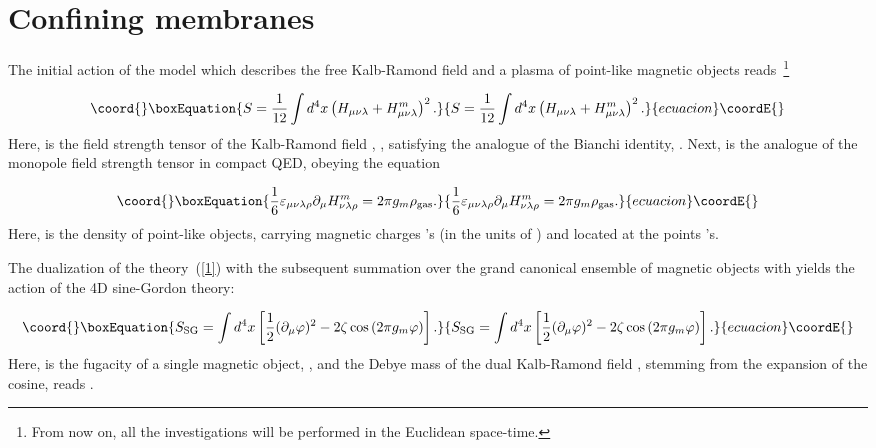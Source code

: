 \documentclass[a4paper,12pt]{article}
\begin{document}
\section{Confining membranes}

The initial action of 
the model which describes the free Kalb-Ramond field and a plasma of point-like magnetic objects 
reads~\footnote{From now on, all the investigations will be performed in the 
Euclidean space-time.}

\begin{equation}\coord{}\boxEquation{
\label{1}
S=\frac{1}{12}\int d^4x\left(H_{\mu\nu\lambda}+H_{\mu\nu\lambda}^m\right)^2.
}{
S=\frac{1}{12}\int d^4x\left(H_{\mu\nu\lambda}+H_{\mu\nu\lambda}^m\right)^2.
}{ecuacion}\coordE{}\end{equation}
Here, \coordHE{} is the field strength tensor of the Kalb-Ramond field
\coordHE{}, \coordHE{}, 
satisfying the analogue of the Bianchi identity, \coordHE{}. Next, \coordHE{} is the analogue of the monopole field strength 
tensor in compact QED, obeying the equation 

\begin{equation}\coord{}\boxEquation{
\label{bi}
\frac16\varepsilon_{\mu\nu\lambda\rho}\partial_\mu
H_{\nu\lambda\rho}^m=2\pi g_m\rho_{\rm gas}. 
}{
\frac16\varepsilon_{\mu\nu\lambda\rho}\partial_\mu
H_{\nu\lambda\rho}^m=2\pi g_m\rho_{\rm gas}. 
}{ecuacion}\coordE{}\end{equation}
Here, \coordHE{} is the density of point-like  
objects, carrying magnetic charges \coordHE{}'s (in the units of \coordHE{}) and located at the points \coordHE{}'s.

The dualization of the theory~(\ref{1}) with the subsequent summation over the grand canonical ensemble
of magnetic objects with \coordHE{} yields the action of the 4D sine-Gordon theory:

\begin{equation}\coord{}\boxEquation{
\label{sg}
S_{\rm SG}=\int d^4x\left[\frac12(\partial_\mu\varphi)^2-2\zeta\cos\left(2\pi g_m\varphi\right)\right].
}{
S_{\rm SG}=\int d^4x\left[\frac12(\partial_\mu\varphi)^2-2\zeta\cos\left(2\pi g_m\varphi\right)\right].
}{ecuacion}\coordE{}\end{equation}
Here, \coordHE{} is the fugacity of a single magnetic object, 
\coordHE{}, 
and the Debye mass of the dual Kalb-Ramond field \myHighlight{$\varphi$}\coordHE{}, stemming from the expansion of the cosine,
reads \coordHE{}. 
\end{document}
